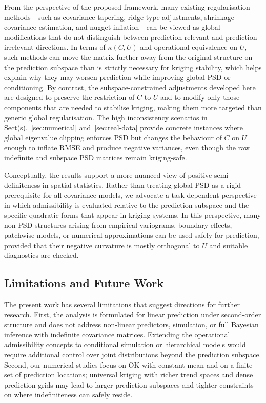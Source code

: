\documentclass[smallextended]{svjour3}
\newcommand{\1}{\mathbf{1}}
\begin{document}
From the perspective of the proposed framework, many existing regularisation methods—such as covariance tapering, ridge-type adjustments, shrinkage covariance estimation, and nugget inflation—can be viewed as global modifications that do not distinguish between prediction-relevant and prediction-irrelevant directions. In terms of $\kappa(C,U)$ and operational equivalence on $U$, such methods can move the matrix further away from the
original structure on the prediction subspace than is strictly necessary for kriging stability, which helps explain why they may worsen prediction while improving global PSD or conditioning. By contrast, the subspace-constrained adjustments developed here are designed to preserve the restriction of $C$ to $U$ and to modify only those components that are needed to stabilise kriging, making them more targeted than generic global regularisation. The high inconsistency scenarios in Sect(s).~\ref{sec:numerical} and~\ref{sec:real-data} provide concrete instances where global eigenvalue clipping enforces PSD but changes the behaviour of $C$ on $U$ enough to inflate RMSE and produce
negative variances, even though the raw indefinite and subspace PSD matrices remain kriging-safe.

Conceptually, the results support a more nuanced view of positive semi-definiteness in spatial statistics. Rather than treating global PSD as a rigid prerequisite for all covariance models, we advocate a task-dependent perspective in which admissibility is evaluated relative to the prediction subspace and the specific quadratic forms that appear in kriging systems. In this perspective, many non-PSD structures arising from empirical variograms, boundary effects, patchwise models, or numerical approximations can be used safely for prediction, provided that their negative curvature is mostly orthogonal to $U$ and suitable diagnostics are checked.

\subsection{Limitations and Future Work}

The present work has several limitations that suggest directions for further research. First, the analysis is formulated for linear prediction under second-order structure and does not address non-linear predictors, simulation, or full Bayesian inference with indefinite covariance matrices. Extending the operational admissibility concepts to conditional simulation or hierarchical models would require additional control over joint distributions beyond the prediction subspace. Second, our numerical studies focus on OK with constant mean and on a finite set of prediction locations; universal
kriging with richer trend spaces and dense prediction grids may lead to larger prediction subspaces and tighter constraints on where indefiniteness can safely reside.
\end{document}
